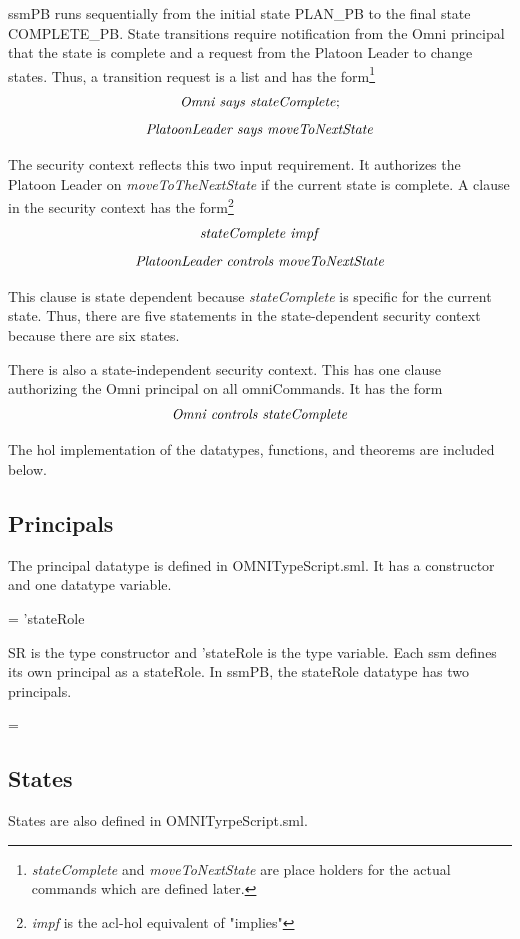 \documentclass[../../main/main.tex]{subfiles}
\begin{document}
ssmPB runs sequentially from the initial state PLAN_PB to the final state COMPLETE_PB.  State transitions require notification from the Omni principal that the state is complete and a request from the Platoon Leader to change states.  Thus, a transition request is a list and has the form\footnote{\textit{stateComplete} and \textit{moveToNextState} are place holders for the actual commands which are defined later.} 
\[\text{\textit{Omni says stateComplete}};\]
\[\text{\textit{PlatoonLeader says moveToNextState}}\]  

The security context reflects this two input requirement.  It authorizes the Platoon Leader on \textit{moveToTheNextState} if the current state is complete. A clause in the security context has the form\footnote{\textit{impf} is the \gls{acl}-\gls{hol} equivalent of "implies"}
\[\text{\textit{stateComplete impf}}\]
\[\text{\textit{PlatoonLeader controls moveToNextState}}\]  

This clause is state dependent because \textit{stateComplete} is specific for the current state.  Thus, there are five statements in the state-dependent security context because there are six states.

There is also a state-independent security context.  This has one clause authorizing the Omni principal on all omniCommands.   It has the form
\[\text{\textit{Omni controls stateComplete}}\]

The \gls{hol} implementation of the datatypes, functions, and theorems are included below.


\subsection{Principals}
The principal datatype is defined in OMNITypeScript.sml.  It has a constructor and one datatype variable.

 =  'stateRole

SR is the type constructor and 'stateRole is the type variable.  Each \gls{ssm} defines its own principal as a stateRole. In ssmPB, the stateRole datatype has two principals.

 =  \HOLTokenBar{} 

\subsection{States}
States are also defined in OMNITyrpeScript.sml.
\end{document}
